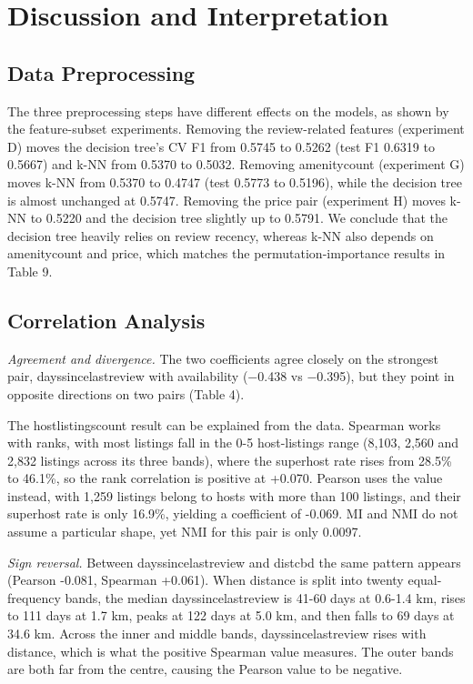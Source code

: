 \documentclass[final,1p,11pt]{elsarticle}
\renewcommand\_{\textunderscore\allowbreak}%
\begin{document}
\section{Discussion and Interpretation}

\subsection{Data Preprocessing}

The three preprocessing steps have different effects on the models, as shown by the feature-subset experiments. Removing the review-related features (experiment D) moves the decision tree's CV F1 from 0.5745 to 0.5262 (test F1 0.6319 to 0.5667) and k-NN from 0.5370 to 0.5032. Removing amenity\_count (experiment G) moves k-NN from 0.5370 to 0.4747 (test 0.5773 to 0.5196), while the decision tree is almost unchanged at 0.5747. Removing the price pair (experiment H) moves k-NN to 0.5220 and the decision tree slightly up to 0.5791. We conclude that the decision tree heavily relies on review recency, whereas k-NN also depends on amenity\_count and price, which matches the permutation-importance results in Table 9.

\subsection{Correlation Analysis}

\textit{Agreement and divergence.} The two coefficients agree closely on the strongest pair, days\_since\_last\_review with availability\_365 (−0.438 vs −0.395), but they point in opposite directions on two pairs (Table 4).

The host\_listings\_count result can be explained from the data. Spearman works with ranks, with most listings fall in the 0-5 host-listings range (8,103, 2,560 and 2,832 listings across its three bands), where the superhost rate rises from 28.5\% to 46.1\%, so the rank correlation is positive at +0.070. Pearson uses the value instead, with 1,259 listings belong to hosts with more than 100 listings, and their superhost rate is only 16.9\%, yielding a coefficient of -0.069. MI and NMI do not assume a particular shape, yet NMI for this pair is only 0.0097.

\textit{Sign reversal.} Between days\_since\_last\_review and dist\_cbd the same pattern appears (Pearson -0.081, Spearman +0.061). When distance is split into twenty equal-frequency bands, the median days\_since\_last\_review is 41-60 days at 0.6-1.4 km, rises to 111 days at 1.7 km, peaks at 122 days at 5.0 km, and then falls to 69 days at 34.6 km. Across the inner and middle bands, days\_since\_last\_review rises with distance, which is what the positive Spearman value measures. The outer bands are both far from the centre, causing the Pearson value to be negative.
\end{document}
